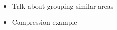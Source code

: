 \begin{itemize}
  \item Talk about grouping similar areas
  \item Compression example
\end{itemize}
